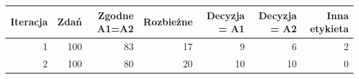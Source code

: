 \begin{tabular}{rrrrrrr}
\toprule
Iteracja & Zdań & Zgodne A1=A2 & Rozbieżne & Decyzja = A1 & Decyzja = A2 & Inna etykieta \\
\midrule
1 & 100 & 83 & 17 & 9 & 6 & 2 \\
2 & 100 & 80 & 20 & 10 & 10 & 0 \\
\bottomrule
\end{tabular}
